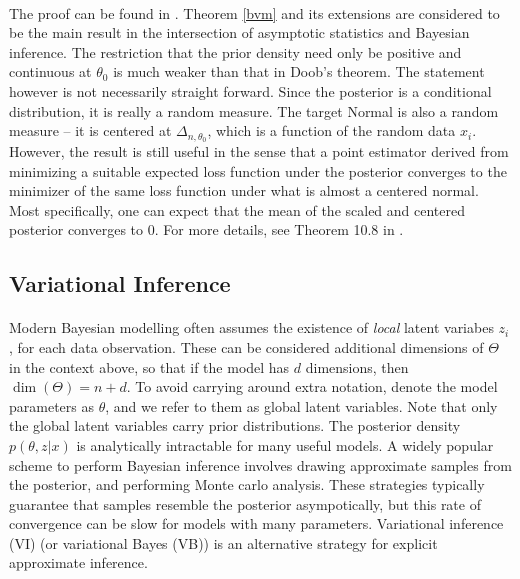 \paragraph{} The proof can be found in \cite{Asymptotics:2000}. Theorem \ref{bvm} and its extensions are considered to be the main result in the intersection of asymptotic statistics and Bayesian inference. The restriction that the prior density need only be positive and continuous at $\theta_0$ is much weaker than that in Doob's theorem. The statement however is not necessarily straight forward. Since the posterior is a conditional distribution, it is really a random measure. The target Normal is also a random measure -- it is centered at $\Delta_{n, \theta_0}$, which is a function of the random data $x_i$. However, the result is still useful in the sense that a point estimator derived from minimizing a suitable expected loss function under the posterior converges to the minimizer of the same loss function under what is almost a centered normal. Most specifically, one can expect that the mean of the scaled and centered posterior converges to 0. For more details, see Theorem 10.8 in \cite{Asymptotics:2000}.  
 
\subsection{Variational Inference}

\paragraph{} Modern Bayesian modelling often assumes the existence of \textit{local} latent variabes $z_i$, for each data observation. These can be considered additional dimensions of $\Theta$ in the context above, so that if the model has $d$ dimensions, then $\dim(\Theta) = n+d$. To avoid carrying around extra notation, denote the model parameters as $\theta$, and we refer to them as global latent variables. Note that only the global latent variables carry prior distributions. The posterior density $p(\theta,z |x)$ is analytically intractable for many useful models. A widely popular scheme to perform Bayesian inference involves drawing approximate samples from the posterior, and performing Monte carlo analysis. These strategies typically guarantee that samples resemble the posterior asympotically, but this rate of convergence can be slow for models with many parameters. Variational inference (VI) (or variational Bayes (VB)) is an alternative strategy for explicit approximate inference. 

